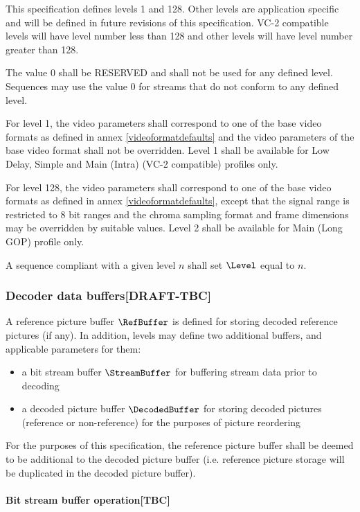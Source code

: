 This specification defines levels 1 and 128. Other levels are application 
specific and will be defined in future revisions of this specification. VC-2
compatible levels will have level number less than 128 and other levels
will have level number greater than 128.

The value 0 shall be RESERVED and shall not be used for any defined level. 
Sequences may use the value 0 for streams that do not conform to any defined level. 

For level 1, the video parameters shall correspond 
to one of the base video formats as defined in annex \ref{videoformatdefaults} 
and the video parameters
of the base video format shall not be overridden. Level 1 shall be available
for Low Delay, Simple and Main (Intra) (VC-2 compatible) profiles only.

For level 128, the video parameters shall correspond to one of the base video
formats as defined in annex \ref{videoformatdefaults}, 
except that the signal range is restricted
to 8 bit ranges and the chroma sampling format and frame dimensions may be
overridden by suitable values. Level 2 shall be available for Main (Long GOP)
profile only.

A sequence compliant with a given level $n$ shall set $\Level$ equal to $n$.

\subsubsection{Decoder data buffers[DRAFT-TBC]}

A reference picture buffer $\RefBuffer$ is defined for storing 
decoded reference pictures (if any). In addition, levels may define
two additional buffers, and applicable parameters for them:

\begin{itemize}
\item a bit stream buffer $\StreamBuffer$ for buffering 
stream data prior to decoding
\item a decoded picture buffer $\DecodedBuffer$ for storing 
decoded pictures (reference or non-reference) for the purposes
of picture reordering
\end{itemize}

For the purposes of this specification, the reference picture 
buffer shall be deemed to be additional to the
decoded picture buffer (i.e. reference picture storage will be
duplicated in the decoded picture buffer).

\paragraph{Bit stream buffer operation[TBC]}$\ $\newline

